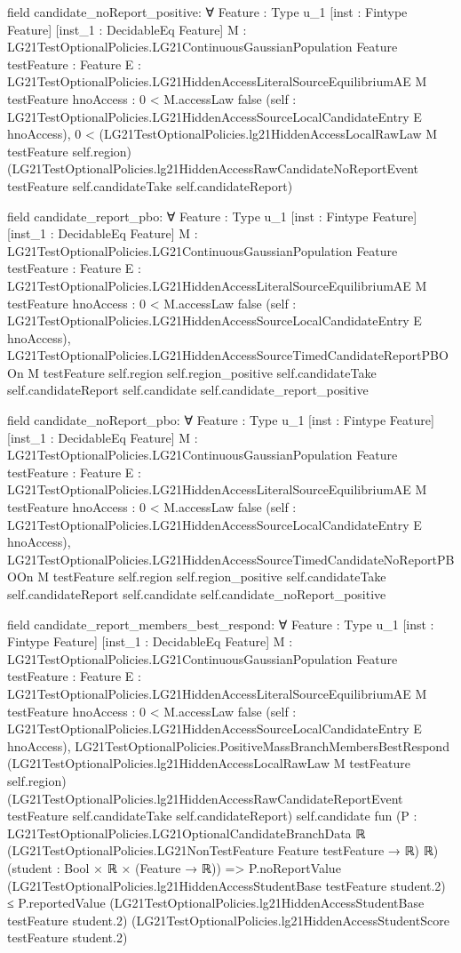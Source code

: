 \documentclass[10pt]{article}
\begin{document}
\begin{ReviewVerbatim}
field candidate_noReport_positive:
∀ {Feature : Type u_1} [inst : Fintype Feature] [inst_1 : DecidableEq Feature]
  {M : LG21TestOptionalPolicies.LG21ContinuousGaussianPopulation Feature} {testFeature : Feature}
  {E : LG21TestOptionalPolicies.LG21HiddenAccessLiteralSourceEquilibriumAE M testFeature}
  {hnoAccess : 0 < M.accessLaw {false}}
  (self : LG21TestOptionalPolicies.LG21HiddenAccessSourceLocalCandidateEntry E hnoAccess),
  0 <
    (LG21TestOptionalPolicies.lg21HiddenAccessLocalRawLaw M testFeature self.region)
      (LG21TestOptionalPolicies.lg21HiddenAccessRawCandidateNoReportEvent testFeature self.candidateTake
        self.candidateReport)

field candidate_report_pbo:
∀ {Feature : Type u_1} [inst : Fintype Feature] [inst_1 : DecidableEq Feature]
  {M : LG21TestOptionalPolicies.LG21ContinuousGaussianPopulation Feature} {testFeature : Feature}
  {E : LG21TestOptionalPolicies.LG21HiddenAccessLiteralSourceEquilibriumAE M testFeature}
  {hnoAccess : 0 < M.accessLaw {false}}
  (self : LG21TestOptionalPolicies.LG21HiddenAccessSourceLocalCandidateEntry E hnoAccess),
  LG21TestOptionalPolicies.LG21HiddenAccessSourceTimedCandidateReportPBOOn M testFeature self.region
    self.region_positive self.candidateTake self.candidateReport self.candidate self.candidate_report_positive

field candidate_noReport_pbo:
∀ {Feature : Type u_1} [inst : Fintype Feature] [inst_1 : DecidableEq Feature]
  {M : LG21TestOptionalPolicies.LG21ContinuousGaussianPopulation Feature} {testFeature : Feature}
  {E : LG21TestOptionalPolicies.LG21HiddenAccessLiteralSourceEquilibriumAE M testFeature}
  {hnoAccess : 0 < M.accessLaw {false}}
  (self : LG21TestOptionalPolicies.LG21HiddenAccessSourceLocalCandidateEntry E hnoAccess),
  LG21TestOptionalPolicies.LG21HiddenAccessSourceTimedCandidateNoReportPBOOn M testFeature self.region
    self.region_positive self.candidateTake self.candidateReport self.candidate self.candidate_noReport_positive

field candidate_report_members_best_respond:
∀ {Feature : Type u_1} [inst : Fintype Feature] [inst_1 : DecidableEq Feature]
  {M : LG21TestOptionalPolicies.LG21ContinuousGaussianPopulation Feature} {testFeature : Feature}
  {E : LG21TestOptionalPolicies.LG21HiddenAccessLiteralSourceEquilibriumAE M testFeature}
  {hnoAccess : 0 < M.accessLaw {false}}
  (self : LG21TestOptionalPolicies.LG21HiddenAccessSourceLocalCandidateEntry E hnoAccess),
  LG21TestOptionalPolicies.PositiveMassBranchMembersBestRespond
    (LG21TestOptionalPolicies.lg21HiddenAccessLocalRawLaw M testFeature self.region)
    (LG21TestOptionalPolicies.lg21HiddenAccessRawCandidateReportEvent testFeature self.candidateTake
      self.candidateReport)
    self.candidate
    fun
      (P :
        LG21TestOptionalPolicies.LG21OptionalCandidateBranchData ℝ
          (LG21TestOptionalPolicies.LG21NonTestFeature Feature testFeature → ℝ) ℝ)
      (student : Bool × ℝ × (Feature → ℝ)) =>
    P.noReportValue (LG21TestOptionalPolicies.lg21HiddenAccessStudentBase testFeature student.2) ≤
      P.reportedValue (LG21TestOptionalPolicies.lg21HiddenAccessStudentBase testFeature student.2)
        (LG21TestOptionalPolicies.lg21HiddenAccessStudentScore testFeature student.2)


\end{ReviewVerbatim}
\end{document}
